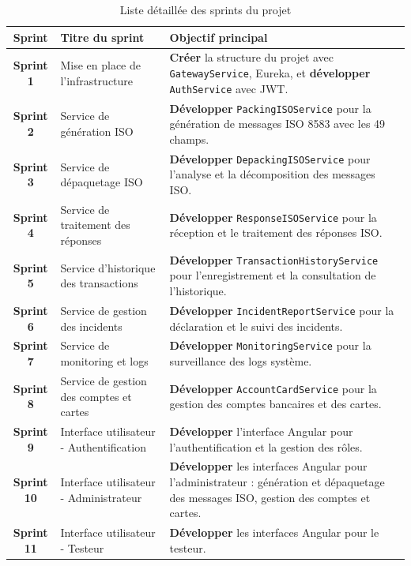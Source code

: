 \begin{table}[H]
\centering
{}
\renewcommand{\arraystretch}{1.5}
\begin{tabular}{|>{\bfseries}c|m{4cm}|m{9cm}|}
\hline
\rowcolor{blue!20}
Sprint & \textbf{Titre du sprint} & \textbf{Objectif principal} \\
\hline
Sprint 1 & Mise en place de l'infrastructure & \textbf{Créer} la structure du projet avec \texttt{GatewayService}, Eureka, et \textbf{développer} \texttt{AuthService} avec JWT. \\
\hline
Sprint 2 & Service de génération ISO & \textbf{Développer} \texttt{PackingISOService} pour la génération de messages ISO 8583 avec les 49 champs. \\
\hline
Sprint 3 & Service de dépaquetage ISO & \textbf{Développer} \texttt{DepackingISOService} pour l'analyse et la décomposition des messages ISO. \\
\hline
Sprint 4 & Service de traitement des réponses & \textbf{Développer} \texttt{ResponseISOService} pour la réception et le traitement des réponses ISO. \\
\hline
Sprint 5 & Service d'historique des transactions & \textbf{Développer} \texttt{TransactionHistoryService} pour l'enregistrement et la consultation de l'historique. \\
\hline
Sprint 6 & Service de gestion des incidents & \textbf{Développer} \texttt{IncidentReportService} pour la déclaration et le suivi des incidents. \\
\hline
Sprint 7 & Service de monitoring et logs & \textbf{Développer} \texttt{MonitoringService} pour la surveillance des logs système. \\
\hline
Sprint 8 & Service de gestion des comptes et cartes & \textbf{Développer} \texttt{AccountCardService} pour la gestion des comptes bancaires et des cartes. \\
\hline
Sprint 9 & Interface utilisateur - Authentification & \textbf{Développer} l'interface Angular pour l'authentification et la gestion des rôles. \\
\hline
Sprint 10 & Interface utilisateur - Administrateur & \textbf{Développer} les interfaces Angular pour l'administrateur : génération et dépaquetage des messages ISO, gestion des comptes et cartes. \\
\hline
Sprint 11 & Interface utilisateur - Testeur & \textbf{Développer} les interfaces Angular pour le testeur. \\
\hline
\end{tabular}
\caption{Liste détaillée des sprints du projet}
\label{tab:sprints-projet}
\end{table}



